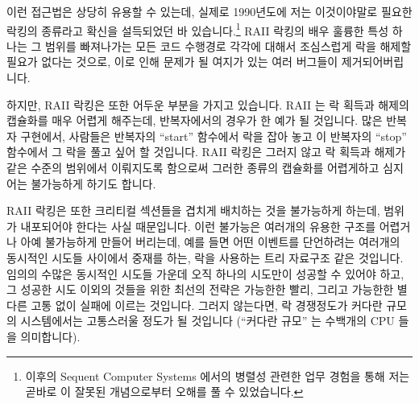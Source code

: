 이런 접근법은 상당히 유용할 수 있는데, 실제로 1990년도에 저는 이것이야말로
필요한 락킹의 종류라고 확신을 설득되었던 바 있습니다.\footnote{
	이후의 Sequent Computer Systems 에서의 병렬성 관련한 업무 경험을 통해
	저는 곧바로 이 잘못된 개념으로부터 오해를 풀 수 있었습니다.}
RAII 락킹의 배우 훌륭한 특성 하나는 그 범위를 빠져나가는 모든 코드 수행경로
각각에 대해서 조심스럽게 락을 해제할 필요가 없다는 것으로, 이로 인해 문제가 될
여지가 있는 여러 버그들이 제거되어버립니다.

하지만, RAII 락킹은 또한 어두운 부분을 가지고 있습니다.
RAII 는 락 획득과 해제의 캡슐화를 매우 어렵게 해주는데, 반복자에서의 경우가 한
예가 될 것입니다.
많은 반복자 구현에서, 사람들은 반복자의 ``start'' 함수에서 락을 잡아 놓고 이
반복자의 ``stop'' 함수에서 그 락을 풀고 싶어 할 것입니다.
RAII 락킹은 그러지 않고 락 획득과 해제가 같은 수준의 범위에서 이뤄지도록
함으로써 그러한 종류의 캡슐화를 어렵게하고 심지어는 불가능하게 하기도 합니다.

RAII 락킹은 또한 크리티컬 섹션들을 겹치게 배치하는 것을 불가능하게 하는데,
범위가 내포되어야 한다는 사실 때문입니다.
이런 불가능은 여러개의 유용한 구조를 어렵거나 아예 불가능하게 만들어 버리는데,
예를 들면 어떤 이벤트를 단언하려는 여러개의 동시적인 시도들 사이에서 중재를
하는, 락을 사용하는 트리 자료구조 같은 것입니다.
임의의 수많은 동시적인 시도들 가운데 오직 하나의 시도만이 성공할 수 있어야
하고, 그 성공한 시도 이외의 것들을 위한 최선의 전략은 가능한한 빨리, 그리고
가능한한 별다른 고통 없이 실패에 이르는 것입니다.
그러지 않는다면, 락 경쟁정도가 커다란 규모의 시스템에서는 고통스러울 정도가 될
것입니다 (``커다란 규모'' 는 수백개의 CPU 들을 의미합니다).
\iffalse

